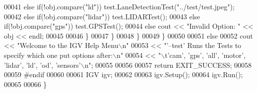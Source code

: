 \begin{DoxyCode}
00041           \textcolor{keywordflow}{else} \textcolor{keywordflow}{if}(!obj.compare(\textcolor{stringliteral}{"ld"}))       test.LaneDetectionTest(\textcolor{stringliteral}{"../test/test.jpeg"});
00042           \textcolor{keywordflow}{else} \textcolor{keywordflow}{if}(!obj.compare(\textcolor{stringliteral}{"lidar"}))    test.LIDARTest();
00043           \textcolor{keywordflow}{else} \textcolor{keywordflow}{if}(!obj.compare(\textcolor{stringliteral}{"gps"}))      test.GPSTest();
00044           \textcolor{keywordflow}{else} cout << \textcolor{stringliteral}{"Invalid Option: "} << obj << endl;
00045 
00046         \}
00047       \}
00048     \}
00049   \}
00050 
00051   \textcolor{keywordflow}{else}
00052     cout  << \textcolor{stringliteral}{"Welcome to the IGV Help Menu\(\backslash\)n"}
00053           << \textcolor{stringliteral}{"'--test' Runs the Tests to specify which one put options after:\(\backslash\)n"}
00054           << \textcolor{stringliteral}{"\(\backslash\)t'cam', 'gps', 'all', 'motor', 'lidar', 'ld', 'od', 'sensors'\(\backslash\)n"};
00055 
00056 
00057   \textcolor{keywordflow}{return} EXIT\_SUCCESS;
00058 
00059 \textcolor{preprocessor}{#}\textcolor{preprocessor}{endif}
00060 
00061   IGV igv;
00062 
00063   igv.Setup();
00064   igv.Run();
00065 
00066 \}
\end{DoxyCode}
